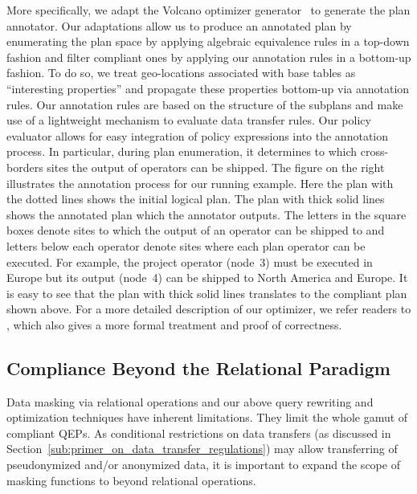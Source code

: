 \documentclass[11pt]{article}
\begin{document}
More specifically, we adapt the Volcano optimizer
generator~\cite{GraefeM93} to generate the plan annotator.
Our adaptations allow us to produce an annotated plan by
enumerating the plan space by applying algebraic equivalence
rules in a top-down fashion and filter compliant ones by
applying our annotation rules in a bottom-up fashion. To do
so, we treat geo-locations associated with base tables as
``interesting properties'' and propagate these properties
bottom-up via annotation rules. Our annotation rules are
based on the structure of the subplans and make use of a
lightweight mechanism to evaluate data transfer rules. Our
policy evaluator allows for easy integration of policy
expressions into the annotation process. In particular,
during plan enumeration, it determines to which
cross-borders sites the output of operators can be shipped.
The figure on the right illustrates the annotation process
for our running example. Here the plan with the dotted lines
shows the initial logical plan. The plan with thick solid
lines shows the annotated plan which the annotator outputs.
The letters in the square boxes denote sites to which the
output of an operator can be shipped to and letters below
each operator denote sites where each plan operator can be
executed. For example, the project operator (node~3) must be
executed in Europe but its output (node~4) can be shipped to
North America and Europe. It is easy to see that the plan
with thick solid lines translates to the compliant plan
shown above. For a more detailed description of our
optimizer, we refer readers to \cite{cqp-sigmod}, which also
gives a more formal treatment and proof of correctness.







\subsection{Compliance Beyond the Relational Paradigm} %
\label{sub:open_problems_&_research_directions}

Data masking via relational operations and our above query
rewriting and optimization techniques have inherent
limitations. They limit the whole gamut of compliant QEPs.
As conditional restrictions on data transfers (as discussed
in Section~\ref{sub:primer_on_data_transfer_regulations})
may allow transferring of pseudonymized and/or anonymized
data, it is important to expand the scope of masking
functions to beyond relational operations.
\end{document}
